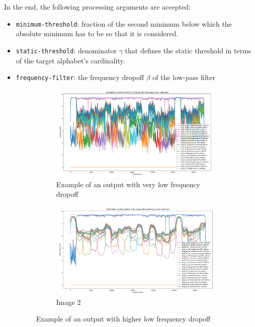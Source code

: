 \documentclass{article}
\begin{document}
In the end, the following processing arguments are accepted:
\begin{itemize}
    \item \texttt{minimum-threshold}: fraction of the second minimum below which the absolute minimum has to be so that it is considered.
    \item \texttt{static-threshold}: denominator $\gamma$ that defines the static threshold in terms of the target alphabet's cardinality.
    \item \texttt{frequency-filter}: the frequency dropoff $\beta$ of the low-pass filter

    \begin{figure}
        \centering
        \begin{subfigure}[b]{0.4\textwidth}
            \centering
            \includegraphics[width=\textwidth]{./images/no_freq_dropoff.png}
            \caption{Example of an output with very low frequency dropoff}
            \label{fig:no_freq_dropoff}
        \end{subfigure}
        \hfill
        \begin{subfigure}[b]{0.4\textwidth}
            \centering
            \includegraphics[width=\textwidth]{./images/freq_dropoff.png}
            \caption{Image 2}
            \label{fig:image2}
        \end{subfigure}
        \caption{Example of an output with higher low frequency dropoff}
        \label{fig:freq_dropoff}
    \end{figure}


\end{itemize}
\end{document}
